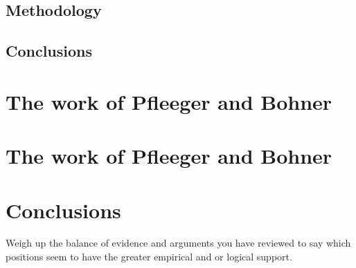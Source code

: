 \documentclass[a4paper,portrait,12pt]{article}
\begin{document}
\subsection{Methodology}

\subsection{Conclusions}
 
\section{The work of Pfleeger and Bohner}

\section{The work of Pfleeger and Bohner}

\section{Conclusions}

Weigh up the balance of evidence and arguments you have reviewed to say which
positions seem to have the greater empirical and or logical support.



\end{document}
